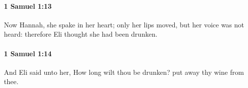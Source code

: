 		\paragraph{1 Samuel 1:13} %
			\label{1SAMUEL-1-13}

			Now Hannah, she spake in her heart; only her lips moved, but her voice was not heard: therefore Eli thought she had been drunken.


		\paragraph{1 Samuel 1:14} %
			\label{1SAMUEL-1-14}

			And Eli said unto her, How long wilt thou be drunken? put away thy wine from thee.


